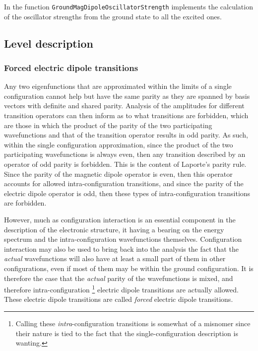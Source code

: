 \documentclass{article}
\newcommand{\codetext}[1]{{\color{BlueViolet} \texttt{#1}}}
\begin{document}
In \qlanth the function \codetext{GroundMagDipoleOscillatorStrength} implements the calculation of the oscillator strengths from the ground state to all the excited ones.

 

\subsection{Level description}

\subsubsection{Forced electric dipole transitions}

Any two eigenfunctions that are approximated within the limits of a single configuration cannot help but have the same parity as they are spanned by basis vectors with definite and shared parity. Analysis of the amplitudes for different transition operators can then inform as to what transitions are forbidden, which are those in which the product of the parity of the two participating wavefunctions and that of the transition operator results in odd parity. As such, within the single configuration approximation, since the product of the two participating wavefunctions is always even, then any transition described by an operator of odd parity is forbidden. This is the content of  Laporte's parity rule. Since the parity of the magnetic dipole operator is even, then this operator accounts for allowed intra-configuration transitions, and since the parity of the electric dipole operator is odd, then these types of intra-configuration transitions are forbidden.

However, much as configuration interaction is an essential component in the description of the electronic structure, it having a bearing on the energy spectrum and the intra-configuration wavefunctions themselves. Configuration interaction may also be used to bring back into the analysis the fact that the \textit{actual} wavefunctions will also have at least a small part of them in other configurations, even if most of them may be within the ground configuration. It is therefore the case that the \textit{actual} parity of the wavefunctions is mixed, and therefore intra-configuration \footnote{Calling these \textit{intra}-configuration transitions is somewhat of a misnomer since their nature is tied to the fact that the single-configuration description is wanting.} electric dipole transitions are actually allowed. These electric dipole transitions are called \textit{forced} electric dipole transitions.
\end{document}
